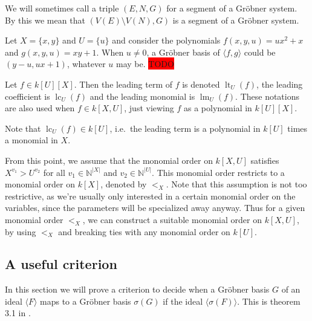 \documentclass[a4paper, 12pt]{article}
\newcommand{\N}{\mathbb{N}}
\DeclareMathOperator{\LT}{lt}
\DeclareMathOperator{\LM}{lm}
\DeclareMathOperator{\LC}{lc}
\theoremstyle{changedot}
\theoremstyle{changedotbreak}
\theoremstyle{nonumberplain}
\begin{document}
We will sometimes call a triple $(E, N, G)$ for a segment of a Gröbner system. By this we mean that $(V(E) \setminus V(N), G)$ is a segment of a Gröbner system.

\begin{example}\upshape
  Let $X = \{x, y\}$ and $U = \{u\}$ and consider the polynomials $f(x, y, u) = ux^{2} + x$ and $g(x, y, u) = xy + 1$. When $u \neq 0$, a Gröbner basis of $\langle f, g \rangle$ could be $(y-u, ux + 1)$, whatever $u$ may be. \colorbox{red}{TODO}
\end{example}

\begin{definition}
  Let $f \in k[U][X]$. Then the leading term of $f$ is denoted $\LT_{U}(f)$, the leading coefficient is $\LC_{U}(f)$ and the leading monomial is $\LM_{U}(f)$. These notations are also used when $f \in k[X, U]$, just viewing $f$ as a polynomial in $k[U][X]$.
\end{definition}

Note that $\LC_{U}(f) \in k[U]$, i.e.\ the leading term is a polynomial in $k[U]$ times a monomial in $X$.

From this point, we assume that the monomial order on $k[X, U]$ satisfies $X^{v_{1}} > U^{v_{2}}$ for all $v_{1} \in \N^{|X|}$ and $v_{2} \in \N^{|U|}$. This monomial order restricts to a monomial order on $k[X]$, denoted by $<_{X}$. Note that this assumption is not too restrictive, as we're usually only interested in a certain monomial order on the variables, since the parameters will be specialized away anyway. Thus for a given monomial order $<_{X}$, we can construct a suitable monomial order on $k[X, U]$, by using $<_{X}$ and breaking ties with any monomial order on $k[U]$.

\subsection{A useful criterion}
In this section we will prove a criterion to decide when a Gröbner basis $G$ of an ideal $\langle F \rangle$ maps to a Gröbner basis $\sigma(G)$ if the ideal $\langle \sigma(F) \rangle$. This is theorem 3.1 in \cite{Kalkbrener}.
\end{document}
